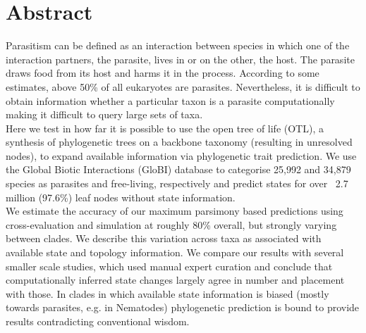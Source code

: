 \chapter*{Abstract}





  Parasitism can be defined as an interaction between species in which one of the interaction 
    partners, the parasite, lives in or on the other, the host. The parasite draws food from its 
    host and harms it in the process. According to some estimates, above 50\% of all eukaryotes are 
    parasites. Nevertheless, it is difficult to obtain information whether a particular taxon is a 
    parasite computationally making it difficult to query large sets of taxa. \\

  Here we test in how far it is possible to use the open tree of life (OTL), a synthesis of 
    phylogenetic trees on a backbone taxonomy (resulting in unresolved nodes), to expand available 
    information via phylogenetic trait prediction. We use the Global Biotic Interactions (GloBI) 
    database to categorise 25,992 and 34,879 species as parasites and free-living, respectively and 
    predict states for over ~2.7 million (97.6\%) leaf nodes without state information. \\

  We estimate the accuracy of our maximum parsimony based predictions using cross-evaluation and 
    simulation at roughly 80\% overall, but strongly varying between clades. We describe this 
    variation across taxa as associated with available state and topology information. We compare 
    our results with several smaller scale studies, which used manual expert curation and conclude 
    that computationally inferred state changes largely agree in number and placement with those. In 
    clades in which available state information is biased (mostly towards parasites, e.g. in 
    Nematodes) phylogenetic prediction is bound to provide results contradicting conventional 
    wisdom. \\


